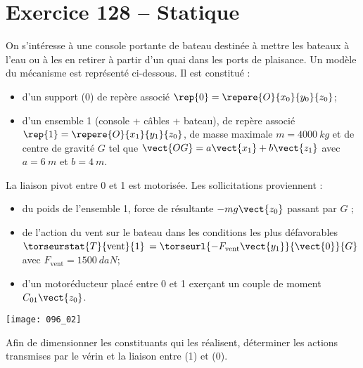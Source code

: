 \section*{Exercice 128 -- Statique}
\setcounter{exo}{0}



On s’intéresse à une console portante de bateau destinée à mettre
les bateaux à l’eau ou à les en retirer à partir d’un quai dans les ports
de plaisance.
Un modèle du mécanisme est représenté ci-dessous. Il est
constitué :
\begin{itemize}
\item  d’un support (0) de repère associé $\rep{0}= \repere{O}{x_0}{y_0}{z_0}$;
\item d’un ensemble 1 (console + câbles + bateau), de repère
associé $\rep{1}= \repere{O}{x_1}{y_1}{z_0}$, de masse maximale $m=\SI{4000}{kg}$ et de centre de gravité $G$ tel que $\vect{OG} = a \vect{x_1} +  b\vect{z_1}$ avec $a =\SI{6}{m}$ et $b =\SI{4}{m}$.
\end{itemize}
La liaison pivot entre 0 et 1 est motorisée.
Les sollicitations proviennent :
\begin{itemize}
\item du poids de l’ensemble 1, force de résultante $-mg \vect{z_0}$ passant par $G$ ;
\item de l’action du vent sur le bateau dans les conditions les plus défavorables $\torseurstat{T}{\text{vent}}{1}$ $=\torseurl{-F_{\text{vent}}\vect{y_1}}{\vect{0}}{G} $ avec $F_{\text{vent}}=\SI{1500}{daN}$;
\item d’un motoréducteur placé entre 0 et 1 exerçant un couple de moment $C_{01}\vect{z_0}$. 
\end{itemize}




\begin{center}
\texttt{[image: 096\_02]}
\end{center}


\begin{obj}
Afin de dimensionner les constituants qui les réalisent, déterminer les actions transmises par le
vérin et la liaison entre (1) et (0).
\end{obj}

